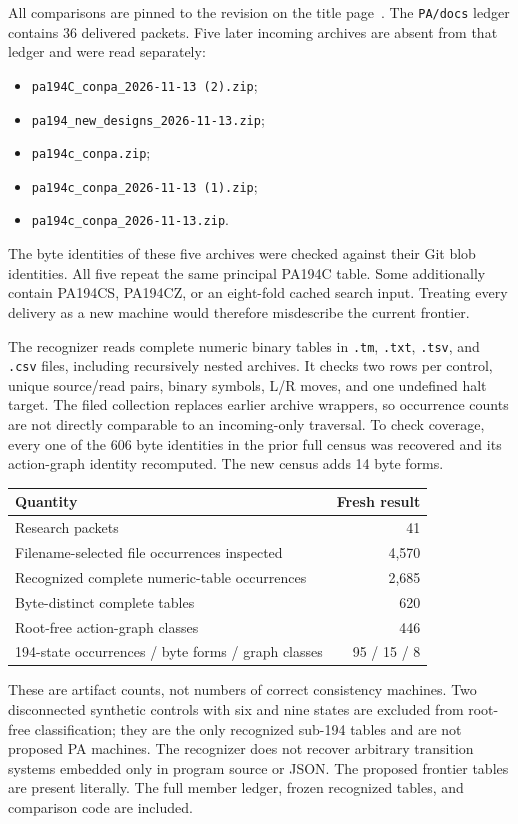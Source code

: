 \documentclass[11pt,letterpaper]{article}
\newcommand{\file}[1]{\texttt{\nolinkurl{#1}}}
\begin{document}
All comparisons are pinned to the revision on the title page~\cite{repo}. The
\file{PA/docs} ledger contains 36 delivered packets. Five later incoming
archives are absent from that ledger and were read separately:
\begin{itemize}
\item \file{pa194C_conpa_2026-11-13 (2).zip};
\item \file{pa194_new_designs_2026-11-13.zip};
\item \file{pa194c_conpa.zip};
\item \file{pa194c_conpa_2026-11-13 (1).zip};
\item \file{pa194c_conpa_2026-11-13.zip}.
\end{itemize}
The byte identities of these five archives were checked against their
Git blob identities. All five repeat the same principal PA194C table.
Some additionally contain PA194CS, PA194CZ, or an eight-fold cached
search input. Treating every delivery as a new machine would therefore
misdescribe the current frontier.

The recognizer reads complete numeric binary tables in \file{.tm},
\file{.txt}, \file{.tsv}, and \file{.csv} files, including recursively
nested archives. It checks two rows per control, unique source/read
pairs, binary symbols, L/R moves, and one undefined halt target. The
filed collection replaces earlier archive wrappers, so occurrence counts
are not directly comparable to an incoming-only traversal. To check
coverage, every one of the 606 byte identities in the prior full census
was recovered and its action-graph identity recomputed. The new census
adds 14 byte forms.

\begin{center}
\begin{tabular}{@{}lr@{}}
\toprule
Quantity & Fresh result\\
\midrule
Research packets & 41\\
Filename-selected file occurrences inspected & 4,570\\
Recognized complete numeric-table occurrences & 2,685\\
Byte-distinct complete tables & 620\\
Root-free action-graph classes & 446\\
194-state occurrences / byte forms / graph classes & 95 / 15 / 8\\
\bottomrule
\end{tabular}
\end{center}

These are artifact counts, not numbers of correct consistency machines.
Two disconnected synthetic controls with six and nine states are excluded
from root-free classification; they are the only recognized sub-194
tables and are not proposed PA machines. The recognizer does not recover
arbitrary transition systems embedded only in program source or JSON.
The proposed frontier tables are present literally. The full member
ledger, frozen recognized tables, and comparison code are included.
\end{document}
